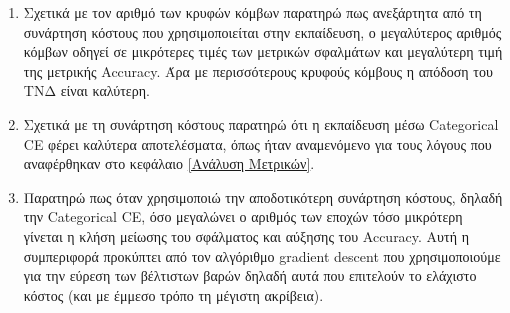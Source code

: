 \documentclass[12pt,a4paper]{article}
\begin{document}
\begin{enumerate}
    \item Σχετικά με τον αριθμό των κρυφών κόμβων παρατηρώ πως ανεξάρτητα από τη συνάρτηση κόστους που χρησιμοποιείται στην εκπαίδευση, ο μεγαλύτερος αριθμός κόμβων οδηγεί σε μικρότερες τιμές των μετρικών σφαλμάτων και μεγαλύτερη τιμή της μετρικής Accuracy. Άρα με περισσότερους κρυφούς κόμβους η απόδοση του ΤΝΔ είναι καλύτερη.
    \item Σχετικά με τη συνάρτηση κόστους παρατηρώ ότι η εκπαίδευση μέσω Categorical CE φέρει καλύτερα αποτελέσματα, όπως ήταν αναμενόμενο για τους λόγους που αναφέρθηκαν στο κεφάλαιο \ref{Ανάλυση Μετρικών}.
    \item Παρατηρώ πως όταν χρησιμοποιώ την αποδοτικότερη συνάρτηση κόστους, δηλαδή την Categorical CE, όσο μεγαλώνει ο αριθμός των εποχών τόσο μικρότερη γίνεται η κλήση μείωσης του σφάλματος και αύξησης του Accuracy. Αυτή η συμπεριφορά προκύπτει από τον αλγόριθμο gradient descent που χρησιμοποιούμε για την εύρεση των βέλτιστων βαρών δηλαδή αυτά που επιτελούν το ελάχιστο κόστος (και με έμμεσο τρόπο τη μέγιστη ακρίβεια).
\end{enumerate}
\end{document}
